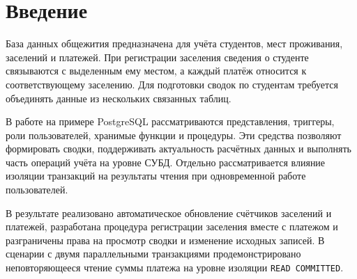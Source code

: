 \newpage
{}%
\section*{Введение}

База данных общежития предназначена для учёта студентов, мест проживания, заселений и платежей. При регистрации заселения сведения о студенте связываются с выделенным ему местом, а каждый платёж относится к соответствующему заселению. Для подготовки сводок по студентам требуется объединять данные из нескольких связанных таблиц.

В работе на примере PostgreSQL рассматриваются представления, триггеры, роли пользователей, хранимые функции и процедуры. Эти средства позволяют формировать сводки, поддерживать актуальность расчётных данных и выполнять часть операций учёта на уровне СУБД. Отдельно рассматривается влияние изоляции транзакций на результаты чтения при одновременной работе пользователей.

В результате реализовано автоматическое обновление счётчиков заселений и платежей, разработана процедура регистрации заселения вместе с платежом и разграничены права на просмотр сводки и изменение исходных записей. В сценарии с двумя параллельными транзакциями продемонстрировано неповторяющееся чтение суммы платежа на уровне изоляции \texttt{READ COMMITTED}.
